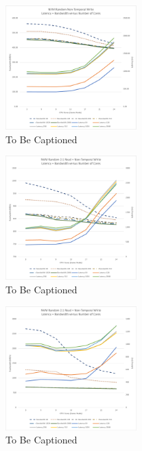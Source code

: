 \begin{figure}
    \centering
    \caption{To Be Captioned} %
    \includegraphics[width=0.45\textwidth]{charts/random-w6-crop.pdf}
\end{figure}

\begin{figure}
    \centering
    \caption{To Be Captioned} %
    \includegraphics[width=0.45\textwidth]{charts/random-w7-crop.pdf}
\end{figure}

\begin{figure}
    \centering
    \caption{To Be Captioned} %
    \includegraphics[width=0.45\textwidth]{charts/random-w8-crop.pdf}
\end{figure}

